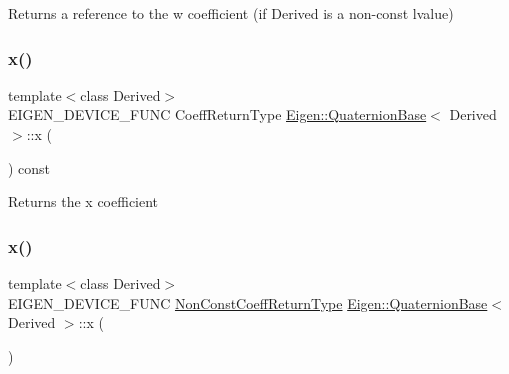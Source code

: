\begin{DoxyReturn}{Returns}
a reference to the {\ttfamily w} coefficient (if Derived is a non-\/const lvalue) 
\end{DoxyReturn}
\mbox{\label{class_eigen_1_1_quaternion_base_af5a6618608a86232397a60d11dbad13d}} 
\subsubsection{\texorpdfstring{x()}{x()}\hspace{0.1cm}{\footnotesize\ttfamily [1/2]}}
{\footnotesize\ttfamily template$<$class Derived$>$ \\
E\+I\+G\+E\+N\+\_\+\+D\+E\+V\+I\+C\+E\+\_\+\+F\+U\+NC Coeff\+Return\+Type \mbox{\hyperlink{class_eigen_1_1_quaternion_base}{Eigen\+::\+Quaternion\+Base}}$<$ Derived $>$\+::x (\begin{DoxyParamCaption}{ }\end{DoxyParamCaption}) const\hspace{0.3cm}{\ttfamily [inline]}}

\begin{DoxyReturn}{Returns}
the {\ttfamily x} coefficient 
\end{DoxyReturn}
\mbox{\label{class_eigen_1_1_quaternion_base_acf78705347fd7e4910004f2868f42350}} 
\subsubsection{\texorpdfstring{x()}{x()}\hspace{0.1cm}{\footnotesize\ttfamily [2/2]}}
{\footnotesize\ttfamily template$<$class Derived$>$ \\
E\+I\+G\+E\+N\+\_\+\+D\+E\+V\+I\+C\+E\+\_\+\+F\+U\+NC \mbox{\hyperlink{struct_eigen_1_1internal_1_1true__type}{Non\+Const\+Coeff\+Return\+Type}} \mbox{\hyperlink{class_eigen_1_1_quaternion_base}{Eigen\+::\+Quaternion\+Base}}$<$ Derived $>$\+::x (\begin{DoxyParamCaption}{ }\end{DoxyParamCaption})\hspace{0.3cm}{\ttfamily [inline]}}

